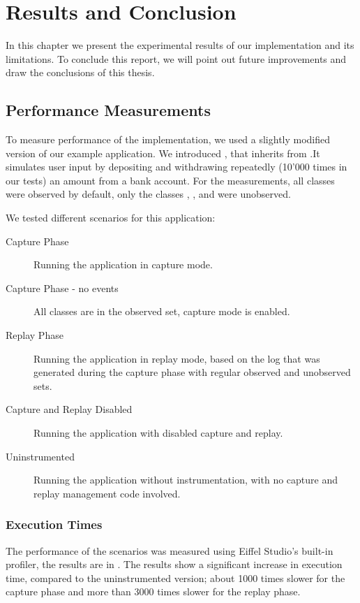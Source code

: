 \chapter{Results and Conclusion}
In this chapter we present the experimental results of our implementation and its limitations. To conclude this report, we will point out future improvements and draw the conclusions of this thesis.


\section{Performance Measurements}
To measure performance of the implementation, we used a slightly modified version of our example application. We introduced , that inherits from .It simulates user input by depositing and withdrawing repeatedly (10'000 times in our tests) an amount from a bank account. For the measurements, all classes were observed by default, only the classes , ,  and  were unobserved.

We tested different scenarios for this application:

\begin{description}
 \item [Capture Phase] Running the application in capture mode.
 \item [Capture Phase - no events] All classes are in the observed set, capture mode is enabled.
 \item [Replay Phase] Running the application in replay mode, based on the log that was generated during the capture phase with regular observed and unobserved sets.
 \item [Capture and Replay Disabled] Running the application with disabled capture and replay.
 \item [Uninstrumented] Running the application without instrumentation, with no capture and replay management code involved.
\end{description}


\subsection{Execution Times}
The performance of the scenarios was measured using Eiffel Studio's built-in profiler, the results are in . The results show a significant increase in execution time, compared to the uninstrumented version; about 1000 times slower for the capture phase and more than 3000 times slower for the replay phase.

